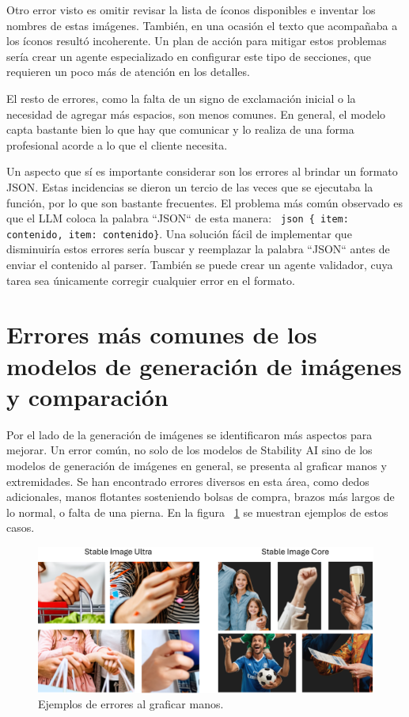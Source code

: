 Otro error visto es omitir revisar la lista de íconos disponibles e inventar los nombres de estas imágenes. También, en una ocasión el texto que acompañaba a los íconos resultó incoherente. Un plan de acción para mitigar estos problemas sería crear un agente especializado en configurar este tipo de secciones, que requieren un poco más de atención en los detalles.

El resto de errores, como la falta de un signo de exclamación inicial o la necesidad de agregar más espacios, son menos comunes. En general, el modelo capta bastante bien lo que hay que comunicar y lo realiza de una forma profesional acorde a lo que el cliente necesita.

Un aspecto que sí es importante considerar son los errores al brindar un formato JSON. Estas incidencias se dieron un tercio de las veces que se ejecutaba la función, por lo que son bastante frecuentes. El problema más común observado es que el LLM coloca la palabra ``JSON`` de esta manera: \texttt{ json \{ item: contenido, item: contenido\}}. Una solución fácil de implementar que disminuiría estos errores sería buscar y reemplazar la palabra ``JSON`` antes de enviar el contenido al parser. También se puede crear un agente validador, cuya tarea sea únicamente corregir cualquier error en el formato.

\section{Errores más comunes de los modelos de generación de imágenes y comparación}

Por el lado de la generación de imágenes se identificaron más aspectos para mejorar. Un error común, no solo de los modelos de Stability AI sino de los modelos de generación de imágenes en general, se presenta al graficar manos y extremidades. Se han encontrado errores diversos en esta área, como dedos adicionales, manos flotantes sosteniendo bolsas de compra, brazos más largos de lo normal, o falta de una pierna. En la figura ~\ref{fig:erroresManos} se muestran ejemplos de estos casos.

\begin{figure}[H]
    \centering
    \includegraphics[width=1\linewidth]{Figures/erroresManos.png}
    \caption{Ejemplos de errores al graficar manos.}
    \label{fig:erroresManos}
\end{figure}

